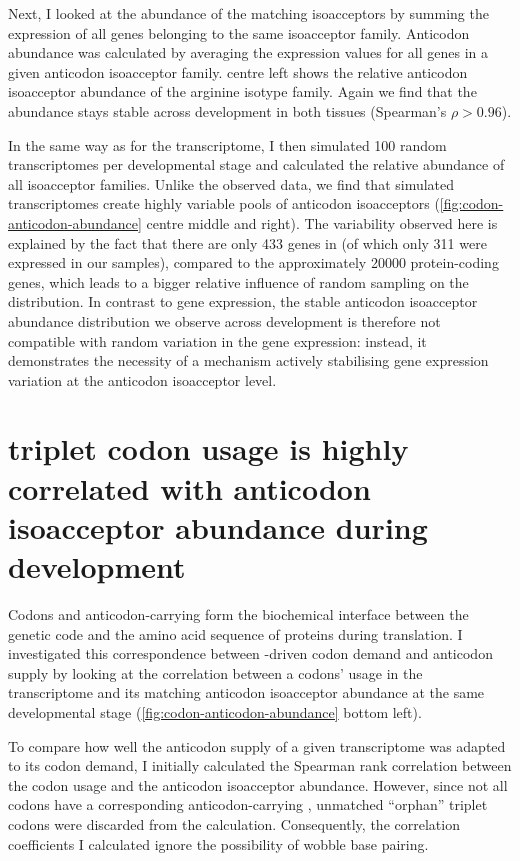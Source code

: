 Next, I looked at the abundance of the matching \trna isoacceptors by summing
the expression of all \trna genes belonging to the same isoacceptor family.
Anticodon abundance was calculated by averaging the expression values for all
\trna genes in a given anticodon isoacceptor family.
 centre left shows the relative anticodon
isoacceptor abundance of the arginine isotype family. Again we find that the
abundance stays stable across development in both tissues (Spearman’s \(\rho >
0.96\)).

In the same way as for the \mrna transcriptome, I then simulated \num{100}
random \trna transcriptomes per developmental stage and calculated the relative
abundance of all isoacceptor families. Unlike the observed \trna data, we find
that simulated \trna transcriptomes create highly variable pools of anticodon
isoacceptors (\cref{fig:codon-anticodon-abundance} centre middle and right). The
variability observed here is explained by the fact that there are only \num{433}
\trna genes in \mmu (of which only \num{311} were expressed in our samples),
compared to the approximately \num{20000} protein-coding genes, which leads to a
bigger relative influence of random sampling on the distribution. In contrast to
\mrna gene expression, the stable anticodon isoacceptor abundance distribution
we observe across development is therefore not compatible with random variation
in the \trna gene expression: instead, it demonstrates the necessity of a
mechanism actively stabilising \trna gene expression variation at the anticodon
isoacceptor level.

\section{ triplet codon usage is highly correlated with 
anticodon isoacceptor abundance during development}

Codons and anticodon-carrying \trna[s] form the biochemical interface between
the genetic code and the amino acid sequence of proteins during \mrna
translation. I investigated this correspondence between \mrna-driven codon
demand and \trna anticodon supply by looking at the correlation between a
codons’ usage in the \mrna transcriptome and its matching \trna anticodon
isoacceptor abundance at the same developmental stage
(\cref{fig:codon-anticodon-abundance} bottom left).

To compare how well the anticodon supply of a given transcriptome was adapted to
its codon demand, I initially calculated the Spearman rank correlation between
the codon usage and the anticodon isoacceptor abundance. However, since not all
codons have a corresponding anticodon-carrying \trna, unmatched “orphan” triplet
codons were discarded from the calculation. Consequently, the correlation
coefficients I calculated ignore the possibility of wobble base pairing.

